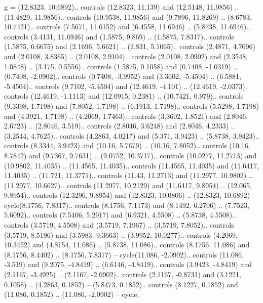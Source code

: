 {g} = {(12.8323, 10.6892).. controls (12.8323, 11.139) and (12.5148, 11.9856) .. (11.4829, 11.9856).. controls (10.9538, 11.9856) and (9.7896, 11.8269) .. (8.6783, 10.7421).. controls (7.5671, 11.6152) and (6.4558, 11.6946) .. (5.8738, 11.6946).. controls (3.4131, 11.6946) and (1.5875, 9.869) .. (1.5875, 7.8317).. controls (1.5875, 6.6675) and (2.1696, 5.6621) .. (2.831, 5.1065).. controls (2.4871, 4.7096) and (2.0108, 3.8365) .. (2.0108, 2.9104).. controls (2.0108, 2.0902) and (2.3548, 1.0848) .. (3.175, 0.5556).. controls (1.5875, 0.1058) and (0.7408, -1.0319) .. (0.7408, -2.0902).. controls (0.7408, -3.9952) and (3.3602, -5.4504) .. (6.5881, -5.4504).. controls (9.7102, -5.4504) and (12.4619, -4.101) .. (12.4619, -2.0373).. controls (12.4619, -1.1113) and (12.0915, 0.2381) .. (10.7421, 0.979).. controls (9.3398, 1.7198) and (7.8052, 1.7198) .. (6.1913, 1.7198).. controls (5.5298, 1.7198) and (4.3921, 1.7198) .. (4.2069, 1.7463).. controls (3.3602, 1.8521) and (2.8046, 2.6723) .. (2.8046, 3.519).. controls (2.8046, 3.6248) and (2.8046, 4.2333) .. (3.2544, 4.7625).. controls (4.2863, 4.0217) and (5.371, 3.9423) .. (5.8738, 3.9423).. controls (8.3344, 3.9423) and (10.16, 5.7679) .. (10.16, 7.8052).. controls (10.16, 8.7842) and (9.7367, 9.7631) .. (9.0752, 10.3717).. controls (10.0277, 11.2713) and (10.9802, 11.4035) .. (11.4565, 11.4035).. controls (11.4565, 11.4035) and (11.6417, 11.4035) .. (11.721, 11.3771).. controls (11.43, 11.2713) and (11.2977, 10.9802) .. (11.2977, 10.6627).. controls (11.2977, 10.2129) and (11.6417, 9.8954) .. (12.065, 9.8954).. controls (12.3296, 9.8954) and (12.8323, 10.0806) .. (12.8323, 10.6892) -- cycle(8.1756, 7.8317).. controls (8.1756, 7.1173) and (8.1492, 6.2706) .. (7.7523, 5.6092).. controls (7.5406, 5.2917) and (6.9321, 4.5508) .. (5.8738, 4.5508).. controls (3.5719, 4.5508) and (3.5719, 7.1967) .. (3.5719, 7.8052).. controls (3.5719, 8.5196) and (3.5983, 9.3663) .. (3.9952, 10.0277).. controls (4.2069, 10.3452) and (4.8154, 11.086) .. (5.8738, 11.086).. controls (8.1756, 11.086) and (8.1756, 8.4402) .. (8.1756, 7.8317) -- cycle(11.086, -2.0902).. controls (11.086, -3.519) and (9.2075, -4.8419) .. (6.6146, -4.8419).. controls (3.9423, -4.8419) and (2.1167, -3.4925) .. (2.1167, -2.0902).. controls (2.1167, -0.8731) and (3.1221, 0.1058) .. (4.2863, 0.1852) -- (5.8473, 0.1852).. controls (8.1227, 0.1852) and (11.086, 0.1852) .. (11.086, -2.0902) -- cycle},
